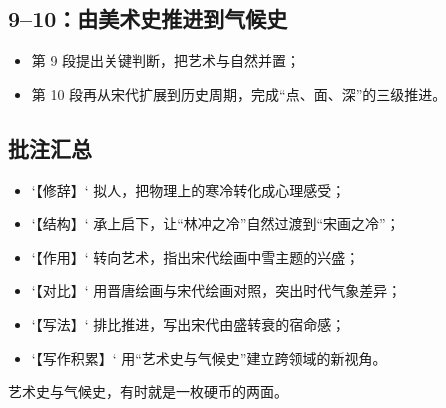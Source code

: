 \begin{handoutlayout}
\begin{summarybox}
\subsection*{9--10：由美术史推进到气候史}
\begin{itemize}[leftmargin=*]
    \item 第 9 段提出关键判断，把艺术与自然并置；
    \item 第 10 段再从宋代扩展到历史周期，完成“点、面、深”的三级推进。
\end{itemize}
\end{summarybox}

\begin{techbox}
\subsection*{批注汇总}
\begin{itemize}[leftmargin=*]
    \item `【修辞】` 拟人，把物理上的寒冷转化成心理感受；
    \item `【结构】` 承上启下，让“林冲之冷”自然过渡到“宋画之冷”；
    \item `【作用】` 转向艺术，指出宋代绘画中雪主题的兴盛；
    \item `【对比】` 用晋唐绘画与宋代绘画对照，突出时代气象差异；
    \item `【写法】` 排比推进，写出宋代由盛转衰的宿命感；
    \item `【写作积累】` 用“艺术史与气候史”建立跨领域的新视角。
\end{itemize}
\end{techbox}

\begin{keyquote}
艺术史与气候史，有时就是一枚硬币的两面。
\end{keyquote}

\end{handoutlayout}

\newpage

